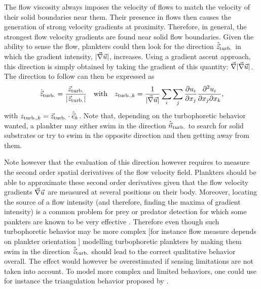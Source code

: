 The flow viscosity always imposes the velocity of flows to match the velocity of their solid boundaries near them.
Their presence in flows then causes the generation of strong velocity gradients at proximity.
Therefore, in general, the strongest flow velocity gradients are found near solid flow boundaries.
Given the ability to sense the flow, plankters could then look for the direction $\hat{\vec{z}}_{\mathrm{turb.}}$ in which the gradient intensity, $\lvert\vec{\nabla} \vec{u}\rvert$, increases.
Using a gradient ascent approach, this direction is simply obtained by taking the gradient of this quantity: $\vec{\nabla} \lvert\vec{\nabla} \vec{u}\rvert$.
The direction to follow can then be expressed as
\begin{equation}\label{eq:turbophoresis_direction}
	\hat{\vec{z}}_{\mathrm{turb.}} = \frac{\vec{z}_{\mathrm{turb.}}}{\lvert\vec{z}_{\mathrm{turb.}}\rvert} \quad \text{with} \quad z_{\mathrm{turb.},k} = \frac{1}{\lvert\vec{\nabla} \vec{u}\rvert} \sum_i \sum_j \frac{\partial u_i}{\partial x_j} \frac{\partial^2 u_i}{\partial x_j \partial x_k},
\end{equation}
with $z_{\mathrm{turb.},k} = \vec{z}_{\mathrm{turb.}} \cdot \hat{\vec{e}}_k$.
Note that, depending on the turbophoretic behavior wanted, a plankter may either swim in the direction $\hat{\vec{n}}_{\mathrm{turb.}}$ to search for solid substrates or try to swim in the opposite direction and then getting away from them.

Note however that the evaluation of this direction however requires to measure the second order spatial derivatives of the flow velocity field.
Plankters should be able to approximate these second order derivatives given that the flow velocity gradients $\vec{\nabla} \vec{u}$ are measured at several positions on their body.
Moreover, locating the source of a flow intensity (and therefore, finding the maxima of gradient intensity) is a common problem for prey or predator detection for which some pankters are known to be very effective \citep{kiorboe1999predator, kiorboe1999hydrodynamic, jiang2002hydrodynamic}.
Therefore even though such turbophoretic behavior may be more complex [for instance flow measure depends on plankter orientation \citep{fields2010orientation}] modelling turbophoretic plankters by making them swim in the direction $\hat{\vec{z}}_{\mathrm{turb.}}$ should lead to the correct qualitative behavior overall.
The effect would however be overestimated if sensing limitations are not taken into account.
To model more complex and limited behaviors, one could use for instance the triangulation behavior proposed by \citet{redaelli2021efficient}.

